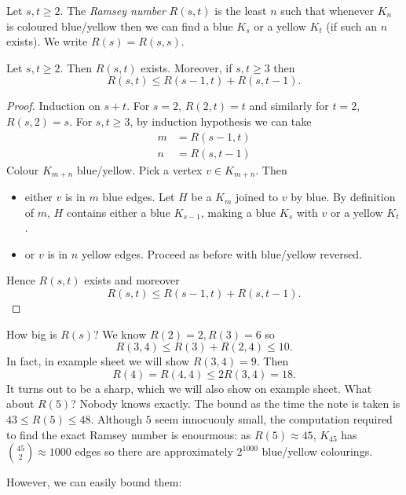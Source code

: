 \documentclass[a4paper]{article}
\begin{document}
\begin{definition}
  Let \(s, t \geq 2\). The \emph{Ramsey number} \(R(s, t)\) is the least \(n\) such that whenever \(K_n\) is coloured blue/yellow then we can find a blue \(K_s\) or a yellow \(K_t\) (if such an \(n\) exists). We write \(R(s) = R(s, s)\).
\end{definition}

\begin{theorem}[Ramsey]
  Let \(s, t \geq 2\). Then \(R(s, t)\) exists. Moreover, if \(s, t \geq 3\) then
  \[
    R(s, t) \leq R(s - 1, t) + R(s, t - 1).
  \]
\end{theorem}

\begin{proof}
  Induction on \(s + t\). For \(s = 2\), \(R(2, t) = t\) and similarly for \(t = 2\), \(R(s, 2) = s\). For \(s, t \geq 3\), by induction hypothesis we can take
  \begin{align*}
    m &= R(s - 1, t) \\
    n &= R(s, t -1)
  \end{align*}
  Colour \(K_{m + n}\) blue/yellow. Pick a vertex \(v \in K_{m + n}\). Then
  \begin{itemize}
  \item either \(v\) is in \(m\) blue edges. Let \(H\) be a \(K_m\) joined to \(v\) by blue. By definition of \(m\), \(H\) contains either a blue \(K_{s - 1}\), making a blue \(K_s\) with \(v\) or a yellow \(K_t\).
  \item or \(v\) is in \(n\) yellow edges. Proceed as before with blue/yellow reversed.
  \end{itemize}
  Hence \(R(s, t)\) exists and moreover
  \[
    R(s, t) \leq R(s- 1, t) + R(s, t - 1).
  \]
\end{proof}

How big is \(R(s)\)? We know \(R(2) = 2, R(3) = 6\) so
\[
  R(3, 4) \leq R(3) + R(2, 4) \leq 10.
\]
In fact, in example sheet we will show \(R(3, 4) = 9\). Then
\[
  R(4) = R(4, 4) \leq 2R(3, 4) = 18.
\]
It turns out to be a sharp, which we will also show on example sheet. What about \(R(5)\)? Nobody knows exactly. The bound as the time the note is taken is \(43 \leq R(5) \leq 48\). Although \(5\) seem innocuouly small, the computation required to find the exact Ramsey number is enourmous: as \(R(5) \approx 45\), \(K_{45}\) has \(\binom{45}{2} \approx 1000\) edges so there are approximately \(2^{1000}\) blue/yellow colourings.

However, we can easily bound them:
\end{document}
